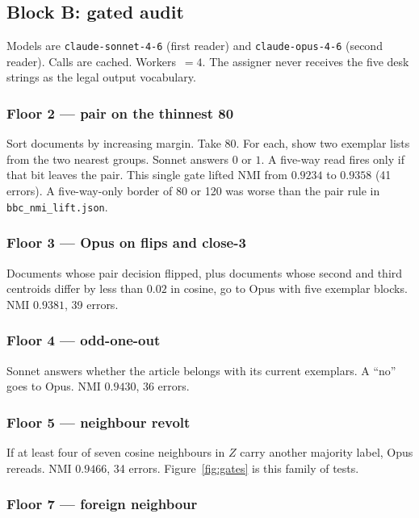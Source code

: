 \documentclass[11pt,a4paper]{article}
\begin{document}
\subsection{Block B: gated audit}

Models are \texttt{claude-sonnet-4-6} (first reader) and
\texttt{claude-opus-4-6} (second reader). Calls are cached.
Workers~$=4$. The assigner never receives the five desk
strings as the legal output vocabulary.

\subsubsection{Floor 2 --- pair on the thinnest 80}

Sort documents by increasing margin. Take $80$. For each,
show two exemplar lists from the two nearest groups. Sonnet
answers $0$ or $1$. A five-way read fires only if that bit
leaves the pair. This single gate lifted NMI from $0.9234$
to $0.9358$ (41 errors). A five-way-only border of 80 or 120
was worse than the pair rule in
\texttt{bbc\_nmi\_lift.json}.

\subsubsection{Floor 3 --- Opus on flips and close-3}

Documents whose pair decision flipped, plus documents whose
second and third centroids differ by less than $0.02$ in
cosine, go to Opus with five exemplar blocks. NMI $0.9381$,
39 errors.

\subsubsection{Floor 4 --- odd-one-out}

Sonnet answers whether the article belongs with its current
exemplars. A ``no'' goes to Opus. NMI $0.9430$, 36 errors.

\subsubsection{Floor 5 --- neighbour revolt}

If at least four of seven cosine neighbours in $Z$ carry
another majority label, Opus rereads. NMI $0.9466$, 34
errors. Figure~\ref{fig:gates} is this family of tests.

\subsubsection{Floor 7 --- foreign neighbour}
\end{document}
